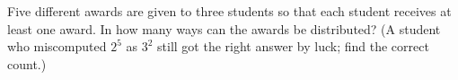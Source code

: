 Five different awards are given to three students so that each student receives at least one award. In how many ways can the awards be distributed? (A student who miscomputed $2^5$ as $3^2$ still got the right answer by luck; find the correct count.)
